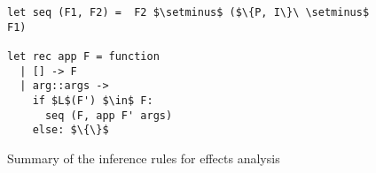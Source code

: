 \begin{figure}[H]
\vspace{0.2cm}
 \begin{prooftree}
\end{prooftree} 
\hfill\begin{prooftree}
\end{prooftree}\\

\vspace{0.2cm}
\begin{prooftree}
\end{prooftree}\hfill
\begin{prooftree}
\end{prooftree}\hfill 
\begin{prooftree}
\end{prooftree} \\

\begin{lstlisting}
let seq (F1, F2) =  F2 $\setminus$ ($\{P, I\}\ \setminus$ F1)

let rec app F = function
  | [] -> F
  | arg::args -> 
    if $L$(F') $\in$ F:
      seq (F, app F' args)
    else: $\{\}$
\end{lstlisting}

\caption{Summary of the inference rules for effects analysis}
\label{fig:inferenceRules}
\end{figure}


